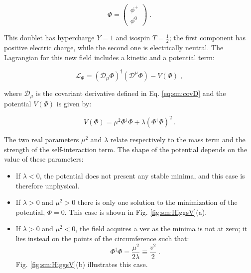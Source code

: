 \begin{equation}
	\Phi = \left( \begin{array}{c} \phi^+  \\ \phi^0 \end{array} \right) \; .
\end{equation}

\noindent This doublet has hypercharge $Y=1$ and isospin $T=\frac{1}{2}$; the first component has positive electric charge, while the second one is electrically neutral. The Lagrangian for this new field includes a kinetic and a potential term:

\begin{equation}
	\mathcal{L}_{\Phi} = ( \mathcal{D}_{\mu} \Phi)^{\dagger} (\mathcal{D}^{\mu} \Phi) - V(\Phi) \; ,
	\label{eq:LHiggs}
\end{equation}

\noindent where $\mathcal{D}_{\mu}$ is the covariant derivative defined in Eq. \ref{eq:sm:covD} and the potential $V(\Phi)$ is given by:

\begin{equation}
 V(\Phi) =  \mu^2 \Phi^{\dagger} \Phi + \lambda (\Phi^{\dagger} \Phi)^2 \, . 
	\label{eq:hpot}
\end{equation}

\noindent The two real parameters $\mu^2$ and $\lambda$ relate respectively to the mass term and the strength of the self-interaction term. The shape of the potential depends on the value of these parameters:
\begin{itemize}
\item If $\lambda < 0$, the potential does not present any stable minima, and this case is therefore unphysical.
\item If $\lambda > 0$ and $\mu^2 > 0$ there is only one solution to the minimization of the potential, $\Phi=0$. This case is shown in Fig. \ref{fig:sm:HiggsV}(a).
\item If $\lambda > 0$ and $\mu^2 < 0$, the field acquires a \gls{vev} as the minima is not at zero; it lies instead on the points of the circumference such that:
\begin{equation}
\Phi^{\dagger} \Phi = \frac{\mu^2}{2 \lambda}  \equiv \frac{v^2}{2} \; .
\end{equation}
\noindent Fig. \ref{fig:sm:HiggsV}(b) illustrates this case.
\end{itemize}


